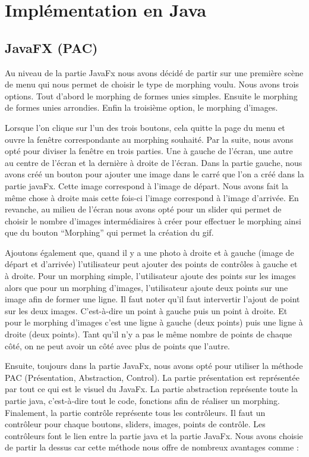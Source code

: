 
\section{Implémentation en Java}

\subsection{JavaFX (PAC)}

Au niveau de la partie JavaFx nous avons décidé de partir sur une première scène de menu qui nous permet de choisir le type de morphing voulu. Nous avons trois options. Tout d’abord le morphing de formes unies simples. Ensuite le morphing de formes unies arrondies. Enfin la troisième option, le morphing d’images.

Lorsque l’on clique sur l’un des trois boutons, cela quitte la page du menu et ouvre la fenêtre correspondante au morphing souhaité. Par la suite, nous avons opté pour diviser la fenêtre en trois parties. Une à gauche de l’écran, une autre au centre de l’écran et la dernière à droite de l’écran. Dans la partie gauche, nous avons créé un bouton pour ajouter une image dans le carré que l’on a créé dans la partie javaFx. Cette image correspond à l’image de départ. Nous avons fait la même chose à droite mais cette fois-ci l’image correspond à l’image d’arrivée. En revanche, au milieu de l’écran nous avons opté pour un slider qui permet de choisir le nombre d’images intermédiaires à créer pour effectuer le morphing ainsi que du bouton “Morphing” qui permet la création du gif.

Ajoutons également que, quand il y a une photo à droite et à gauche (image de départ et d’arrivée) l’utilisateur peut ajouter des points de contrôles à gauche et à droite. Pour un morphing simple, l’utilisateur ajoute des points sur les images alors que pour un morphing d’images, l’utilisateur ajoute deux points sur une image afin de former une ligne. Il faut noter qu’il faut intervertir l’ajout de point sur les deux images. C'est-à-dire un point à gauche puis un point à droite. Et pour le morphing d’images c’est une ligne à gauche (deux points) puis une ligne à droite (deux points). Tant qu’il n’y a pas le même nombre de points de chaque côté, on ne peut avoir un côté avec plus de points que l’autre. 

Ensuite, toujours dans la partie JavaFx, nous avons opté pour utiliser la méthode PAC (Présentation, Abstraction, Control). La partie présentation est représentée par tout ce qui est le visuel du JavaFx. La partie abstraction représente toute la partie java, c'est-à-dire tout le code, fonctions afin de réaliser un morphing. Finalement, la partie contrôle représente tous les contrôleurs. Il faut un contrôleur pour chaque boutons, sliders, images, points de contrôle. Les contrôleurs font le lien entre la partie java et la partie JavaFx. Nous avons choisie de partir la dessus car cette méthode nous offre de nombreux avantages comme :



